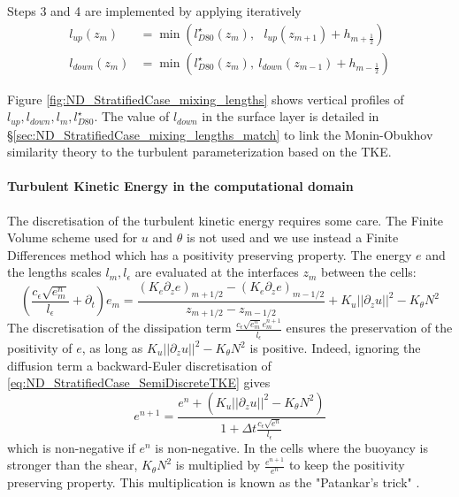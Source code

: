 Steps 3 and 4 are implemented by applying iteratively
\begin{equation}
	\begin{aligned}
		l_{up}(z_m) &= \min\left(l^\star_{D80}(z_m),~~~
		l_{up}(z_{m+1}) + h_{m+\frac{1}{2}}\right) \\
		l_{down}(z_m) &= \min\left(l^\star_{D80}(z_m),~
		l_{down}(z_{m-1}) + h_{m-\frac{1}{2}}\right)
	\end{aligned}
\end{equation}

Figure \ref{fig:ND_StratifiedCase_mixing_lengths} shows vertical
profiles of $l_{up}, l_{down}, l_m, l_{D80}^\star$. The value of
$l_{down}$ in the surface layer is detailed in
\S \ref{sec:ND_StratifiedCase_mixing_lengths_match} to link
the Monin-Obukhov similarity theory to the turbulent
parameterization based on the TKE.
%
\paragraph{Turbulent Kinetic Energy in the computational domain}
The discretisation of the turbulent kinetic energy
requires some care. The Finite Volume scheme used for
$u$ and $\theta$ is not used and we use instead a Finite Differences
method which has a positivity preserving property.
The energy $e$ and the lengths scales
$l_m, l_\epsilon$ are evaluated at the interfaces
$z_m$ between the cells:
\begin{equation}
\label{eq:ND_StratifiedCase_SemiDiscreteTKE}
    \left(
    \frac{c_\epsilon \sqrt{e^n_m}}{l_\epsilon}
    + \partial_t
    \right) e_m
	=\frac{(K_{e} \partial_z e)_{m+1/2} -
	(K_{e} \partial_z e)_{m-1/2}}{
	z_{m+1/2} - z_{m-1/2}
	}
    + K_u ||\partial_z u||^2
    - K_\theta N^2
\end{equation}
The discretisation of the dissipation term
$\frac{c_\epsilon \sqrt{e_m^n}e_m^{n+1}}{l_\epsilon}$
ensures the preservation
of the positivity of $e$, as long as
$K_u ||\partial_z u||^2 - K_\theta N^2$ is positive.
Indeed, ignoring the diffusion term a backward-Euler
discretisation of \eqref{eq:ND_StratifiedCase_SemiDiscreteTKE}
gives
\begin{equation}
	e^{n+1} = \frac{e^n +
	\left(K_u ||\partial_z u||^2 - K_\theta N^2\right)}
	{1 + \Delta t \frac{c_\epsilon \sqrt{e^n}}{l_\epsilon}}
\end{equation}
which is non-negative if $e^n$ is non-negative.
In the cells where the buoyancy is stronger than the shear,
$K_\theta N^2$ is multiplied by
$\frac{e^{n+1}}{e^n}$ to keep the positivity preserving property.
This multiplication is known as the "Patankar's trick"
\citep{lemarie_simplified_2021}.
%

